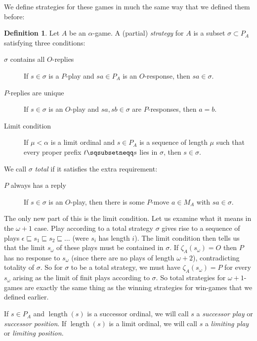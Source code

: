 \documentclass[11pt]{article} %
\theoremstyle{plain} %
\theoremstyle{definition} %
\newtheorem{definition}[theorem]{Definition}
\theoremstyle{note}
\theoremstyle{exercisestyle}
\newcommand{\emptyplay}{\epsilon}
\newcommand{\prefix}{\sqsubseteq}
\newcommand{\pprefix}{\sqsubsetneqq}
\DeclareMathOperator{\length}{length}
\begin{document}
We define strategies for these games in much the same way that we defined them before:

\begin{definition}
  Let $A$ be an $\alpha$-game.  A (partial) \emph{strategy} for $A$ is a subset $\sigma\subset P_A$ satisfying three conditions:
  \begin{description}
    \item[$\sigma$ contains all $O$-replies] If $s\in\sigma$ is a $P$-play and $sa\in P_A$ is an $O$-response, then $sa\in\sigma$.
    \item[$P$-replies are unique] If $s\in\sigma$ is an $O$-play and $sa,sb\in\sigma$ are $P$-responses, then $a=b$.
    \item[Limit condition] If $\mu<\alpha$ is a limit ordinal and $s\in P_A$ is a sequence of length $\mu$ such that every proper prefix $t\pprefix s$ lies in $\sigma$, then $s\in\sigma$.
  \end{description}

  We call $\sigma$ \emph{total} if it satisfies the extra requirement:

  \begin{description}
    \item[$P$ always has a reply] If $s\in\sigma$ is an $O$-play, then there is some $P$-move $a\in M_A$ with $sa\in\sigma$.
  \end{description}
\end{definition}

The only new part of this is the limit condition.  Let us examine what it means in the $\omega+1$ case.  Play according to a total strategy $\sigma$ gives rise to a sequence of plays $\emptyplay \prefix s_1\prefix s_2\prefix\dots$ (were $s_i$ has length $i$).  The limit condition then tells us that the limit $s_\omega$ of these plays must be contained in $\sigma$.  If $\zeta_A(s_\omega)=O$ then $P$ has no response to $s_\omega$ (since there are no plays of length $\omega+2$), contradicting totality of $\sigma$.  So for $\sigma$ to be a total strategy, we must have $\zeta_A(s_\omega)=P$ for every $s_\omega$ arising as the limit of finit plays according to $\sigma$.  So total strategies for $\omega+1$-games are exactly the same thing as the winning strategies for win-games that we defined earlier.  

If $s\in P_A$ and $\length(s)$ is a successor ordinal, we will call $s$ a \emph{successor play} or \emph{successor position}.  If $\length(s)$ is a limit ordinal, we will call $s$ a \emph{limiting play} or \emph{limiting position}.
\end{document}
